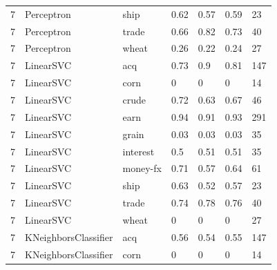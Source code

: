 \documentclass{article}
\begin{document}
\begin{table}[h]
\begin{tabular}{lllllll}
7             & Perceptron             & ship            & 0.62               & 0.57            & 0.59              & 23               \\
7             & Perceptron             & trade           & 0.66               & 0.82            & 0.73              & 40               \\
7             & Perceptron             & wheat           & 0.26               & 0.22            & 0.24              & 27               \\
7             & LinearSVC              & acq             & 0.73               & 0.9             & 0.81              & 147              \\
7             & LinearSVC              & corn            & 0                  & 0               & 0                 & 14               \\
7             & LinearSVC              & crude           & 0.72               & 0.63            & 0.67              & 46               \\
7             & LinearSVC              & earn            & 0.94               & 0.91            & 0.93              & 291              \\
7             & LinearSVC              & grain           & 0.03               & 0.03            & 0.03              & 35               \\
7             & LinearSVC              & interest        & 0.5                & 0.51            & 0.51              & 35               \\
7             & LinearSVC              & money-fx        & 0.71               & 0.57            & 0.64              & 61               \\
7             & LinearSVC              & ship            & 0.63               & 0.52            & 0.57              & 23               \\
7             & LinearSVC              & trade           & 0.74               & 0.78            & 0.76              & 40               \\
7             & LinearSVC              & wheat           & 0                  & 0               & 0                 & 27               \\
7             & KNeighborsClassifier   & acq             & 0.56               & 0.54            & 0.55              & 147              \\
7             & KNeighborsClassifier   & corn            & 0                  & 0               & 0                 & 14               \\

\end{tabular}
\end{table}
\end{document}

